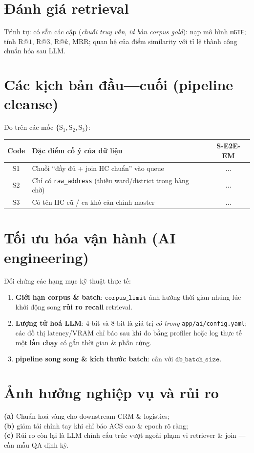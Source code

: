 \section{Đánh giá retrieval}
Trình tự: có sẵn các cặp (\textit{chuỗi truy vấn}, \textit{id bản corpus gold}): nạp mô hình \texttt{mGTE}; tính \(\mathrm{R@}1\), \(\mathrm{R@}3\), \(\mathrm{R@}k\), MRR; quan hệ của điểm similarity với tỉ lệ thành công chuẩn hóa sau LLM.

\section{Các kịch bản đầu---cuối (pipeline cleanse)}
Đo trên các mốc \(\{\mathrm{S}_1,\mathrm{S}_2,\mathrm{S}_3\}\):

\begin{tabular}{cp{11cm}c}
\textbf{Code} & \textbf{Đặc điểm cố ý của dữ liệu} & \textbf{S-E2E-EM} \\
\hline
S1 & Chuỗi ``đầy đủ + join HC chuẩn'' vào queue & \(\ldots\) \\
S2 & Chỉ có \texttt{raw\_address} (thiếu ward/district trong hàng chờ) & \(\ldots\) \\
S3 & Có tên HC cũ / ca khó căn chỉnh master & \(\ldots\) \\
\end{tabular}

\section{Tối ưu hóa vận hành (AI engineering)}
Đối chứng các hạng mục kỹ thuật thực tế:
\begin{enumerate}
  \item \textbf{Giới hạn corpus \& batch}: \(\texttt{corpus\_limit}\) ảnh hưởng thời gian nhúng lúc khởi động song \textbf{rủi ro recall} retrieval.
  \item \textbf{Lượng tử hoá LLM}: 4-bit và 8-bit là giá trị \emph{có trong} \texttt{app/ai/config.yaml}; các đồ thị latency/VRAM chỉ báo sau khi đo bằng profiler hoặc log thực tế một \textbf{lần chạy} có gắn thời gian \& phần cứng.
  \item \textbf{pipeline song song \& kích thước batch}: cân với \(\texttt{db\_batch\_size}\).
\end{enumerate}

\section{Ảnh hưởng nghiệp vụ và rủi ro}
\textbf{(a)} Chuẩn hoá vàng cho downstream CRM \& logistics; \\
\textbf{(b)} giảm tải chỉnh tay khi chỉ báo ACS cao \& epoch rõ ràng; \\
\textbf{(c)} Rủi ro còn lại là LLM chỉnh cấu trúc vượt ngoài phạm vi retriever \& join --- cần mẫu QA định kỳ.

